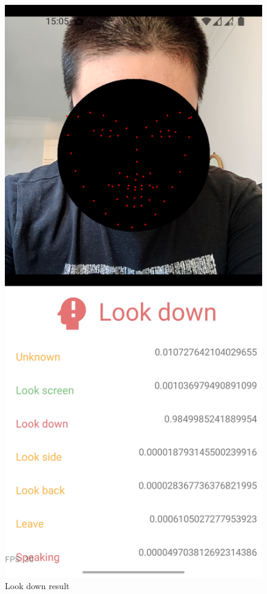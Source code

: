 \begin{minipage}{.5\textwidth}
\begin{figure}[H]
    \centering
    \includegraphics[width=\textwidth]{appendix/imgs/app-core-look-down.jpg}
    \caption{Look down result}
    \label{fig:app-core-look-down}
\end{figure}
\end{minipage}
